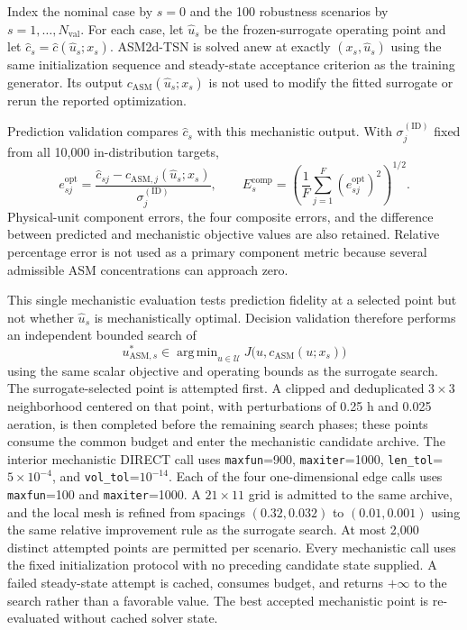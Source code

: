 \documentclass[a4paper,fleqn]{cas-sc}
\DeclareMathOperator*{\argminop}{arg\,min}
\begin{document}
Index the nominal case by $s=0$ and the 100 robustness scenarios by $s=1,\ldots,N_{\mathrm{val}}$. For each case, let $\widehat u_s$ be the frozen-surrogate operating point and let $\widehat c_s=\widehat c(\widehat u_s;x_s)$. ASM2d-TSN is solved anew at exactly $(x_s,\widehat u_s)$ using the same initialization sequence and steady-state acceptance criterion as the training generator. Its output $c_{\mathrm{ASM}}(\widehat u_s;x_s)$ is not used to modify the fitted surrogate or rerun the reported optimization.

Prediction validation compares $\widehat c_s$ with this mechanistic output. With $\sigma_j^{(\mathrm{ID})}$ fixed from all 10,000 in-distribution targets,
\begin{equation}
\label{eq:optimization_prediction_error}
e_{sj}^{\mathrm{opt}}
=\frac{\widehat c_{sj}-c_{\mathrm{ASM},j}(\widehat u_s;x_s)}
{\sigma_j^{(\mathrm{ID})}},
\qquad
E_s^{\mathrm{comp}}
=\left(\frac{1}{F}\sum_{j=1}^{F}(e_{sj}^{\mathrm{opt}})^2\right)^{1/2}.
\end{equation}
Physical-unit component errors, the four composite errors, and the difference between predicted and mechanistic objective values are also retained. Relative percentage error is not used as a primary component metric because several admissible ASM concentrations can approach zero.

This single mechanistic evaluation tests prediction fidelity at a selected point but not whether $\widehat u_s$ is mechanistically optimal. Decision validation therefore performs an independent bounded search of
\begin{equation}
\label{eq:mechanistic_reference_problem}
u_{\mathrm{ASM},s}^*\in
\argminop_{u\in\mathcal U}
J\bigl(u,c_{\mathrm{ASM}}(u;x_s)\bigr)
\end{equation}
using the same scalar objective and operating bounds as the surrogate search. The surrogate-selected point is attempted first. A clipped and deduplicated $3\times3$ neighborhood centered on that point, with perturbations of 0.25 h and 0.025 aeration, is then completed before the remaining search phases; these points consume the common budget and enter the mechanistic candidate archive. The interior mechanistic DIRECT call uses \texttt{maxfun}=900, \texttt{maxiter}=1000, \texttt{len\_tol}=$5\times10^{-4}$, and \texttt{vol\_tol}=$10^{-14}$. Each of the four one-dimensional edge calls uses \texttt{maxfun}=100 and \texttt{maxiter}=1000. A $21\times11$ grid is admitted to the same archive, and the local mesh is refined from spacings $(0.32,0.032)$ to $(0.01,0.001)$ using the same relative improvement rule as the surrogate search. At most 2,000 distinct attempted points are permitted per scenario. Every mechanistic call uses the fixed initialization protocol with no preceding candidate state supplied. A failed steady-state attempt is cached, consumes budget, and returns $+\infty$ to the search rather than a favorable value. The best accepted mechanistic point is re-evaluated without cached solver state.
\end{document}
